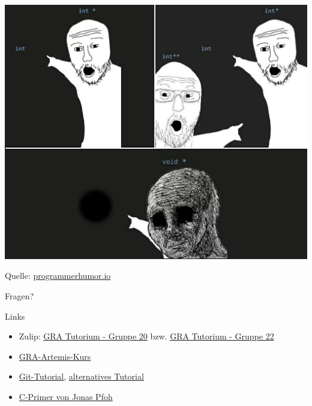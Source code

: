 \documentclass[
  german,            %
  aspectratio=169,    %
]{tumbeamer}
\begin{document}
\begin{frame}[c]{}{}
  \begin{center}
    \includegraphics[height=0.9\textheight]{w01_pointers_meme.png}
  \end{center}
  \centering
  \tiny{Quelle: \href{https://programmerhumor.io/backend-memes/how-to-c-pointers/}{programmerhumor.io}}
\end{frame}

\begin{frame}[c]{}{}
  \begin{center}
    \LARGE Fragen?
  \end{center}
\end{frame}

\begin{frame}[fragile, c]{Links}{}
  \begin{itemize}
    \item Zulip: \href{https://zulip.in.tum.de/#narrow/stream/2267-GRA-Tutorium---Gruppe-20}{\glqq GRA Tutorium - Gruppe 20\grqq}
          bzw. \href{https://zulip.in.tum.de/#narrow/stream/2269-GRA-Tutorium---Gruppe-22}{\glqq GRA Tutorium - Gruppe 22\grqq}
    \item \href{https://artemis.in.tum.de/courses/329}{GRA-Artemis-Kurs}
    \item \href{https://git-scm.com/docs/gittutorial}{Git-Tutorial}, \href{https://rogerdudler.github.io/git-guide/}{alternatives Tutorial}
    \item \href{https://www.sec.in.tum.de/i20/assets/vorlesung/c_primer.pdf}{C-Primer von Jonas Pfoh}
  \end{itemize}
\end{frame}

\maketitle
\end{document}
